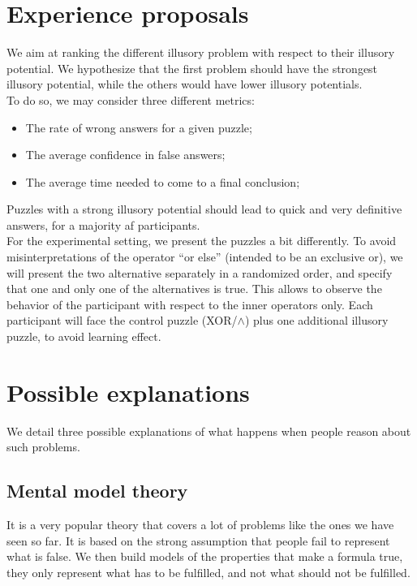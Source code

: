 \documentclass[french]{article}
\begin{document}
\section{Experience proposals}
We aim at ranking the different illusory problem with respect to their illusory potential. We hypothesize that the first problem should have the strongest illusory potential, while the others would have lower illusory potentials.\\
To do so, we may consider three different metrics:
\begin{itemize}
	\item The rate of wrong answers for a given puzzle;
	\item The average confidence in false answers;
	\item The average time needed to come to a final conclusion;
\end{itemize}
Puzzles with a strong illusory potential should lead to quick and very definitive answers, for a majority af participants.\\
For the experimental setting, we present the puzzles a bit differently. To avoid misinterpretations of the operator ``or else'' (intended to be an exclusive or), we will present the two alternative separately in a randomized order, and specify that one and only one of the alternatives is true. This allows to observe the behavior of the participant with respect to the inner operators only. Each participant will face the control puzzle (XOR/$\wedge$) plus one additional illusory puzzle, to avoid learning effect.
\section{Possible explanations}
We detail three possible explanations of what happens when people reason about such problems.
\subsection{Mental model theory}
It is a very popular theory that covers a lot of problems like the ones we have seen so far. It is based on the strong assumption that people fail to represent what is false. We then build models of the properties that make a formula true, they only represent what has to be fulfilled, and not what should not be fulfilled. 
\end{document}
